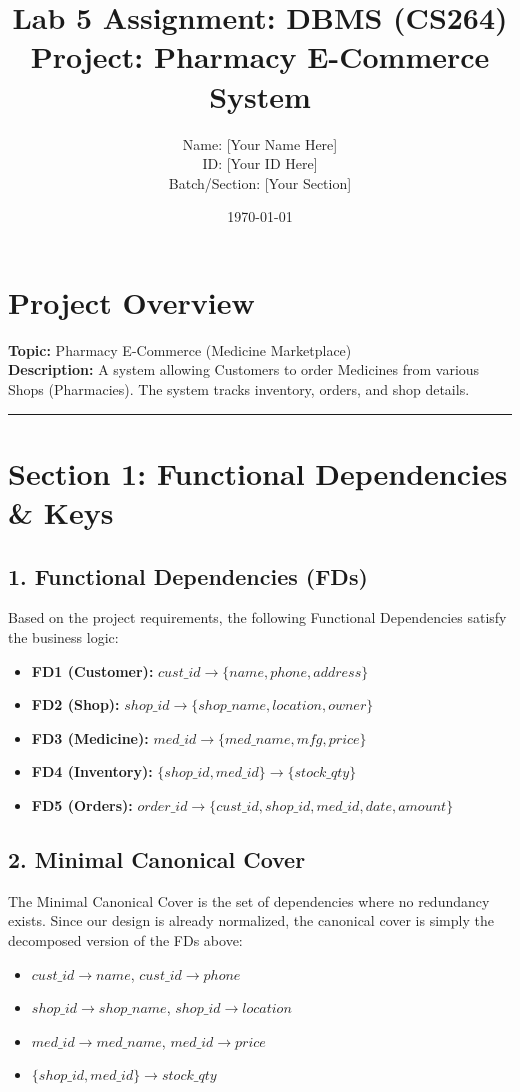 \documentclass{article}
\title{\textbf{Lab 5 Assignment: DBMS (CS264)}\\ \large Project: Pharmacy E-Commerce System}
\author{Name: [Your Name Here] \\ ID: [Your ID Here] \\ Batch/Section: [Your Section]}
\date{\today}
\begin{document}
\maketitle

\section*{Project Overview}
\textbf{Topic:} Pharmacy E-Commerce (Medicine Marketplace)\\
\textbf{Description:} A system allowing Customers to order Medicines from various Shops (Pharmacies). The system tracks inventory, orders, and shop details.

\hrule
\vspace{0.5cm}

\section{Section 1: Functional Dependencies & Keys}

\subsection{1. Functional Dependencies (FDs)}
Based on the project requirements, the following Functional Dependencies satisfy the business logic:

\begin{itemize}
    \item \textbf{FD1 (Customer):} $cust\_id \rightarrow \{name, phone, address\}$
    \item \textbf{FD2 (Shop):} $shop\_id \rightarrow \{shop\_name, location, owner\}$
    \item \textbf{FD3 (Medicine):} $med\_id \rightarrow \{med\_name, mfg, price\}$
    \item \textbf{FD4 (Inventory):} $\{shop\_id, med\_id\} \rightarrow \{stock\_qty\}$
    \item \textbf{FD5 (Orders):} $order\_id \rightarrow \{cust\_id, shop\_id, med\_id, date, amount\}$
\end{itemize}

\subsection{2. Minimal Canonical Cover}
The Minimal Canonical Cover is the set of dependencies where no redundancy exists. Since our design is already normalized, the canonical cover is simply the decomposed version of the FDs above:
\begin{itemize}
    \item $cust\_id \rightarrow name$, $cust\_id \rightarrow phone$
    \item $shop\_id \rightarrow shop\_name$, $shop\_id \rightarrow location$
    \item $med\_id \rightarrow med\_name$, $med\_id \rightarrow price$
    \item $\{shop\_id, med\_id\} \rightarrow stock\_qty$
\end{itemize}
\end{document}
